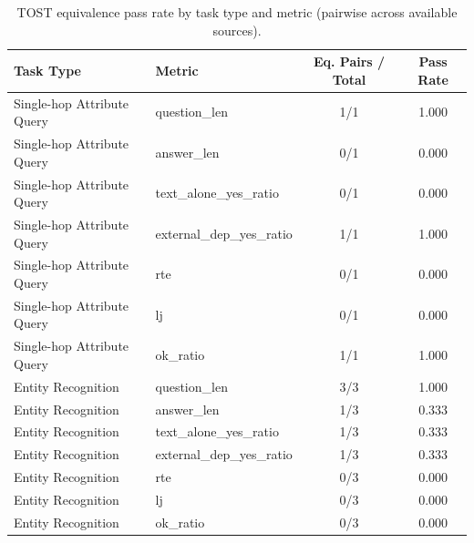 \begin{table}[htbp]
    \centering
    \caption{TOST equivalence pass rate by task type and metric (pairwise across available sources).}
    \begin{tabular}{llcc}
    \hline
    Task Type & Metric & Eq. Pairs / Total & Pass Rate \\
    \hline
    Single-hop Attribute Query & question_len & 1/1 & 1.000 \\
    Single-hop Attribute Query & answer_len & 0/1 & 0.000 \\
    Single-hop Attribute Query & text_alone_yes_ratio & 0/1 & 0.000 \\
    Single-hop Attribute Query & external_dep_yes_ratio & 1/1 & 1.000 \\
    Single-hop Attribute Query & rte & 0/1 & 0.000 \\
    Single-hop Attribute Query & lj & 0/1 & 0.000 \\
    Single-hop Attribute Query & ok_ratio & 1/1 & 1.000 \\
    \hline
    Entity Recognition & question_len & 3/3 & 1.000 \\
    Entity Recognition & answer_len & 1/3 & 0.333 \\
    Entity Recognition & text_alone_yes_ratio & 1/3 & 0.333 \\
    Entity Recognition & external_dep_yes_ratio & 1/3 & 0.333 \\
    Entity Recognition & rte & 0/3 & 0.000 \\
    Entity Recognition & lj & 0/3 & 0.000 \\
    Entity Recognition & ok_ratio & 0/3 & 0.000 \\
    \hline
    \end{tabular}
    \label{tab:cross_source_consistency_tost}
\end{table}
